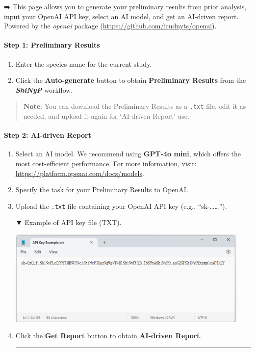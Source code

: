 \documentclass[
]{book}
\begin{document}
➡️ This page allows you to generate your preliminary results from prior analysis, input your OpenAI API key, select an AI model, and get an AI-driven report. Powered by the \emph{openai} package (\url{https://github.com/irudnyts/openai}).

\paragraph*{Step 1: Preliminary Results}\label{step-1-preliminary-results}

\begin{enumerate}
\def\labelenumi{\arabic{enumi}.}
\item
  Enter the species name for the current study.
\item
  Click the {\textbf{Auto-generate}} button to obtain \textbf{Preliminary Results} from the {\textbf{\emph{ShiNyP}}} workflow.
\end{enumerate}

\begin{quote}
\textbf{Note}: You can download the Preliminary Results as a \texttt{.txt} file, edit it as needed, and upload it again for `AI-driven Report' use.
\end{quote}

\paragraph*{Step 2: AI-driven Report}\label{step-2-ai-driven-report}

\begin{enumerate}
\def\labelenumi{\arabic{enumi}.}
\item
  Select an AI model. We recommend using \textbf{GPT-4o mini}, which offers the most cost-efficient performance. For more information, visit: \url{https://platform.openai.com/docs/models}.
\item
  Specify the task for your Preliminary Results to OpenAI.
\item
  Upload the \texttt{.txt} file containing your OpenAI API key (e.g., ``sk-\ldots\ldots{}'').

  ▼ Example of API key file (TXT).

  \includegraphics[width=4.6875in,height=\textheight]{images/clipboard-3104956900.png}
\item
  Click the {\textbf{Get Report}} button to obtain \textbf{AI-driven Report}.

  \begin{center}\rule{0.5\linewidth}{0.5pt}\end{center}
\end{enumerate}
\end{document}
